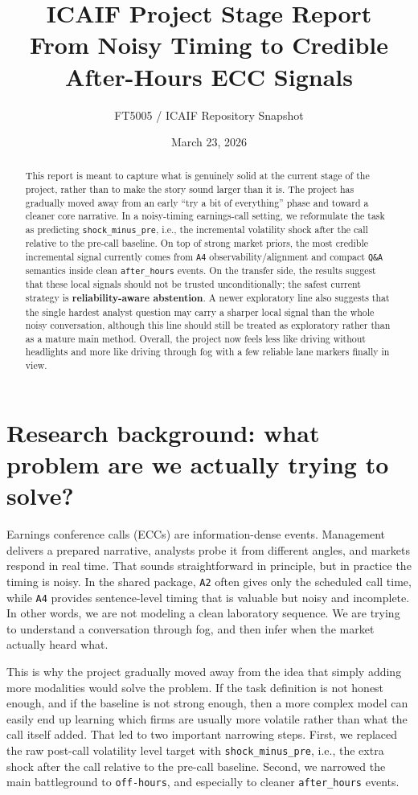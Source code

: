 \documentclass[11pt]{article}
\title{ICAIF Project Stage Report\\\large From Noisy Timing to Credible After-Hours ECC Signals}
\author{FT5005 / ICAIF Repository Snapshot}
\date{March 23, 2026}
\begin{document}
\maketitle

\begin{abstract}
This report is meant to capture what is genuinely solid at the current stage of the project, rather than to make the story sound larger than it is. The project has gradually moved away from an early ``try a bit of everything'' phase and toward a cleaner core narrative. In a noisy-timing earnings-call setting, we reformulate the task as predicting \texttt{shock\_minus\_pre}, i.e., the incremental volatility shock after the call relative to the pre-call baseline. On top of strong market priors, the most credible incremental signal currently comes from \texttt{A4} observability/alignment and compact \texttt{Q\&A} semantics inside clean \texttt{after\_hours} events. On the transfer side, the results suggest that these local signals should not be trusted unconditionally; the safest current strategy is \textbf{reliability-aware abstention}. A newer exploratory line also suggests that the single hardest analyst question may carry a sharper local signal than the whole noisy conversation, although this line should still be treated as exploratory rather than as a mature main method. Overall, the project now feels less like driving without headlights and more like driving through fog with a few reliable lane markers finally in view.
\end{abstract}

\section{Research background: what problem are we actually trying to solve?}
Earnings conference calls (ECCs) are information-dense events. Management delivers a prepared narrative, analysts probe it from different angles, and markets respond in real time. That sounds straightforward in principle, but in practice the timing is noisy. In the shared package, \texttt{A2} often gives only the scheduled call time, while \texttt{A4} provides sentence-level timing that is valuable but noisy and incomplete. In other words, we are not modeling a clean laboratory sequence. We are trying to understand a conversation through fog, and then infer when the market actually heard what.

This is why the project gradually moved away from the idea that simply adding more modalities would solve the problem. If the task definition is not honest enough, and if the baseline is not strong enough, then a more complex model can easily end up learning which firms are usually more volatile rather than what the call itself added. That led to two important narrowing steps. First, we replaced the raw post-call volatility level target with \texttt{shock\_minus\_pre}, i.e., the extra shock after the call relative to the pre-call baseline. Second, we narrowed the main battleground to \texttt{off-hours}, and especially to cleaner \texttt{after\_hours} events.
\end{document}

